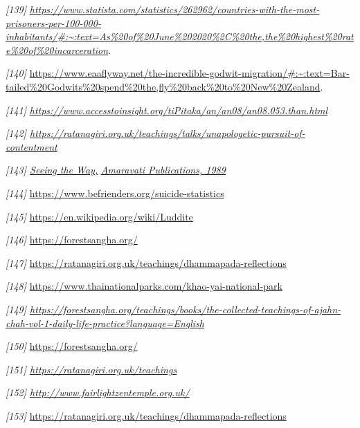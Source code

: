 \emph{{[}139{]}}
\href{https://www.statista.com/statistics/262962/countries-with-the-most-prisoners-per-100-000-inhabitants/\#:~:text=As\%20of\%20June\%202020\%2C\%20the,the\%20highest\%20rate\%20of\%20incarceration}{\emph{\underline{https://www.statista.com/statistics/262962/countries-with-the-most-prisoners-per-100-000-inhabitants/\#:\textasciitilde:text=As\%20of\%20June\%202020\%2C\%20the,the\%20highest\%20rate\%20of\%20incarceration}}}.

\emph{{[}140{]}}
\url{https://www.eaaflyway.net/the-incredible-godwit-migration/\#:~:text=Bar-tailed\%20Godwits\%20spend\%20the,fly\%20back\%20to\%20New\%20Zealand}.

\emph{{[}141{]}}
\href{https://www.accesstoinsight.org/tiPitaka/an/an08/an08.053.than.html}{\emph{\underline{https://www.accesstoinsight.org/tiPitaka/an/an08/an08.053.than.html}}}

\emph{{[}142{]}
\url{https://ratanagiri.org.uk/teachings/talks/unapologetic-pursuit-of-contentment}}

\emph{{[}143{]}
\href{https://www.amaravati.org/dhamma-books/seeing-the-way-volume-1/}{\underline{Seeing
the Way,}}}
\href{https://www.amaravati.org/dhamma-books/seeing-the-way-volume-1/}{\emph{\underline{Amaravati
Publications, 1989}}}

\emph{{[}144{]}} \url{https://www.befrienders.org/suicide-statistics}

\emph{{[}145{]}} \url{https://en.wikipedia.org/wiki/Luddite}

\emph{{[}146{]}} \url{https://forestsangha.org/}

\emph{{[}147{]}}
\url{https://ratanagiri.org.uk/teachings/dhammapada-reflections}

\emph{{[}148{]}}
\url{https://www.thainationalparks.com/khao-yai-national-park}

\emph{{[}149{]}
\href{https://forestsangha.org/teachings/books/the-collected-teachings-of-ajahn-chah-vol-1-daily-life-practice?language=English}{\underline{https://forestsangha.org/teachings/books/the-collected-teachings-of-ajahn-chah-vol-1-daily-life-practice?language=English}}}

\emph{{[}150{]}} \url{https://forestsangha.org/}

\emph{{[}151{]}
\href{https://ratanagiri.org.uk/teachings}{\underline{https://ratanagiri.org.uk/teachings}}}

\emph{{[}152{]}
\href{http://www.fairlightzentemple.org.uk/}{\underline{http://www.fairlightzentemple.org.uk/}}}

\emph{{[}153{]}}
\url{https://ratanagiri.org.uk/teachings/dhammapada-reflections}

